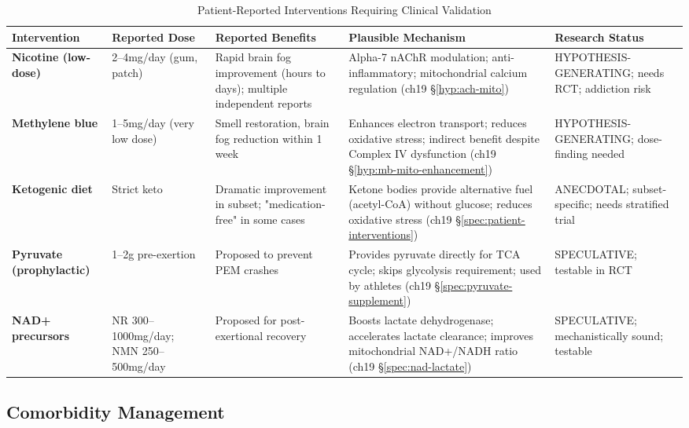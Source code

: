 \begin{table}[htbp]
\centering
\caption{Patient-Reported Interventions Requiring Clinical Validation}
\label{tab:patient-interventions}
\scriptsize
\begin{tabular}{p{2.5cm}p{2cm}p{3.5cm}p{3cm}p{2.5cm}}
\toprule
\textbf{Intervention} & \textbf{Reported Dose} & \textbf{Reported Benefits} & \textbf{Plausible Mechanism} & \textbf{Research Status} \\
\midrule
\textbf{Nicotine (low-dose)} & 2--4mg/day (gum, patch) & Rapid brain fog improvement (hours to days); multiple independent reports & Alpha-7 nAChR modulation; anti-inflammatory; mitochondrial calcium regulation (ch19 \S\ref{hyp:ach-mito}) & HYPOTHESIS-GENERATING; needs RCT; addiction risk \\
\midrule
\textbf{Methylene blue} & 1--5mg/day (very low dose) & Smell restoration, brain fog reduction within 1 week & Enhances electron transport; reduces oxidative stress; indirect benefit despite Complex IV dysfunction (ch19 \S\ref{hyp:mb-mito-enhancement}) & HYPOTHESIS-GENERATING; dose-finding needed \\
\midrule
\textbf{Ketogenic diet} & Strict keto & Dramatic improvement in subset; "medication-free" in some cases & Ketone bodies provide alternative fuel (acetyl-CoA) without glucose; reduces oxidative stress (ch19 \S\ref{spec:patient-interventions}) & ANECDOTAL; subset-specific; needs stratified trial \\
\midrule
\textbf{Pyruvate (prophylactic)} & 1--2g pre-exertion & Proposed to prevent PEM crashes & Provides pyruvate directly for TCA cycle; skips glycolysis requirement; used by athletes (ch19 \S\ref{spec:pyruvate-supplement}) & SPECULATIVE; testable in RCT \\
\midrule
\textbf{NAD+ precursors} & NR 300--1000mg/day; NMN 250--500mg/day & Proposed for post-exertional recovery & Boosts lactate dehydrogenase; accelerates lactate clearance; improves mitochondrial NAD+/NADH ratio (ch19 \S\ref{spec:nad-lactate}) & SPECULATIVE; mechanistically sound; testable \\
\bottomrule
\end{tabular}
\end{table}

\subsection{Comorbidity Management}
\label{subsec:comorbidity-management-evidence}


